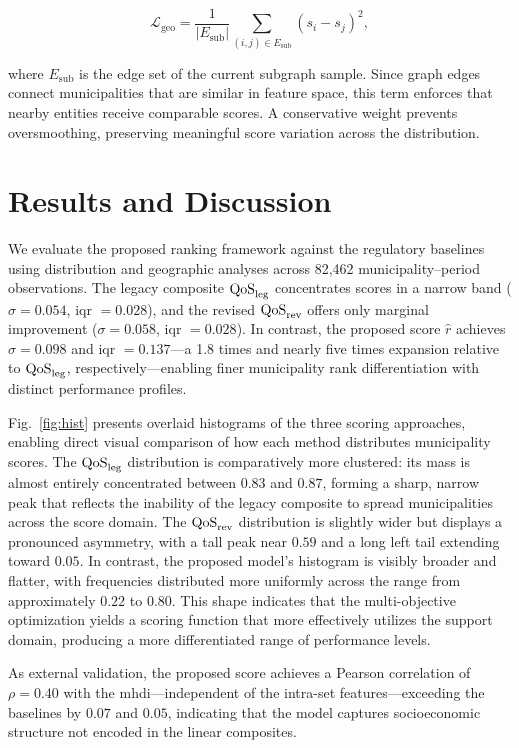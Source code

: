 \documentclass[english]{sbrt}
\begin{document}
\begin{equation}
  \label{eq:l_geo}
  \mathcal{L}_{\mathrm{geo}}
  =  \frac{1}{|E_{\mathrm{sub}}|}
  \sum_{(i,j) \in E_{\mathrm{sub}}} (s_i - s_j)^2,
\end{equation}

\noindent
where $E_{\mathrm{sub}}$ is the edge set of the current subgraph sample. Since
graph edges connect municipalities that are similar in feature space, this term
enforces that nearby entities receive comparable scores. A conservative weight
prevents oversmoothing, preserving meaningful score variation across the
distribution.

\section{Results and Discussion} \label{sec:results}

We evaluate the proposed ranking framework against the regulatory baselines
using distribution and geographic analyses across 82{,}462 municipality--period
observations. The legacy composite $\mathrm{QoS}_\mathrm{leg}$ concentrates scores in a narrow
band ($\sigma = 0.054$, \gls{iqr} $= 0.028$), and the revised $\mathrm{QoS}_\mathrm{rev}$ offers
only marginal improvement ($\sigma = 0.058$, \gls{iqr} $= 0.028$). In contrast,
the proposed score $\hat{r}$ achieves $\sigma = 0.098$ and \gls{iqr} $=
0.137$---a 1.8 times and nearly five times expansion relative to $\mathrm{QoS}_\mathrm{leg}$,
respectively---enabling finer municipality rank differentiation with distinct
performance profiles.

Fig.~\ref{fig:hist} presents overlaid histograms of the three scoring
approaches, enabling direct visual comparison of how each method distributes
municipality scores. The $\mathrm{QoS}_\mathrm{leg}$ distribution is comparatively more clustered:
its mass is almost entirely concentrated between $0.83$ and $0.87$, forming a
sharp, narrow peak that reflects the inability of the legacy composite to spread
municipalities across the score domain. The $\mathrm{QoS}_\mathrm{rev}$ distribution is slightly
wider but displays a pronounced asymmetry, with a tall peak near $0.59$ and a
long left tail extending toward $0.05$. In contrast, the proposed model's
histogram is visibly broader and flatter, with frequencies distributed more
uniformly across the range from approximately $0.22$ to $0.80$. This shape
indicates that the multi-objective optimization yields a scoring function that
more effectively utilizes the support domain, producing a more differentiated
range of performance levels.

As external validation, the proposed score achieves a Pearson correlation of
$\rho = 0.40$ with the \gls{mhdi}---independent of the intra-set
features---exceeding the baselines by $0.07$ and $0.05$, indicating that the
model captures socioeconomic structure not encoded in the linear composites.
\end{document}
